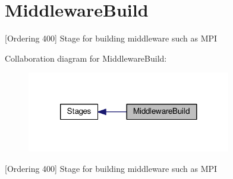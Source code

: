 \hypertarget{group__MiddlewareBuild}{\section{Middleware\-Build}
\label{group__MiddlewareBuild}
}


\mbox{[}Ordering 400\mbox{]} Stage for building middleware such as M\-P\-I  


Collaboration diagram for Middleware\-Build\-:
\nopagebreak
\begin{figure}[H]
\begin{center}
\leavevmode
\includegraphics[width=252pt]{group__MiddlewareBuild}
\end{center}
\end{figure}
\mbox{[}Ordering 400\mbox{]} Stage for building middleware such as M\-P\-I 